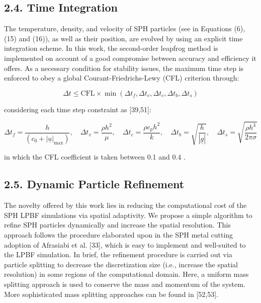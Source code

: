 \documentclass[10pt]{article}
\begin{document}
\subsection*{2.4. Time Integration}
The temperature, density, and velocity of SPH particles (see in Equations (6), (15) and (16)), as well as their position, are evolved by using an explicit time integration scheme. In this work, the second-order leapfrog method is implemented on account of a good compromise between accuracy and efficiency it offers. As a necessary condition for stability issues, the maximum time step is enforced to obey a global Courant-Friedrichs-Lewy (CFL) criterion through:


\begin{equation*}
\Delta t \leq \mathrm{CFL} \times \min \left(\Delta t_{f}, \Delta t_{v}, \Delta t_{c}, \Delta t_{b}, \Delta t_{s}\right) \tag{23}
\end{equation*}


considering each time step constraint as [39,51]:


\begin{equation*}
\Delta t_{f}=\frac{h}{\left(c_{0}+|\underline{u}|_{\max }\right)}, \quad \Delta t_{v}=\frac{\rho h^{2}}{\mu}, \quad \Delta t_{c}=\frac{\rho c_{p} h^{2}}{k}, \quad \Delta t_{b}=\sqrt{\frac{h}{|\underline{g}|}}, \quad \Delta t_{s}=\sqrt{\frac{\rho h^{3}}{2 \pi \sigma}} \tag{24}
\end{equation*}


in which the CFL coefficient is taken between 0.1 and 0.4 .

\subsection*{2.5. Dynamic Particle Refinement}
The novelty offered by this work lies in reducing the computational cost of the SPH LPBF simulations via spatial adaptivity. We propose a simple algorithm to refine SPH particles dynamically and increase the spatial resolution. This approach follows the procedure elaborated upon in the SPH metal cutting adoption of Afrasiabi et al. [33], which is easy to implement and well-suited to the LPBF simulation. In brief, the refinement procedure is carried out via particle splitting to decrease the discretization size (i.e., increase the spatial resolution) in some regions of the computational domain. Here, a uniform mass splitting approach is used to conserve the mass and momentum of the system. More sophisticated mass splitting approaches can be found in [52,53].
\end{document}
